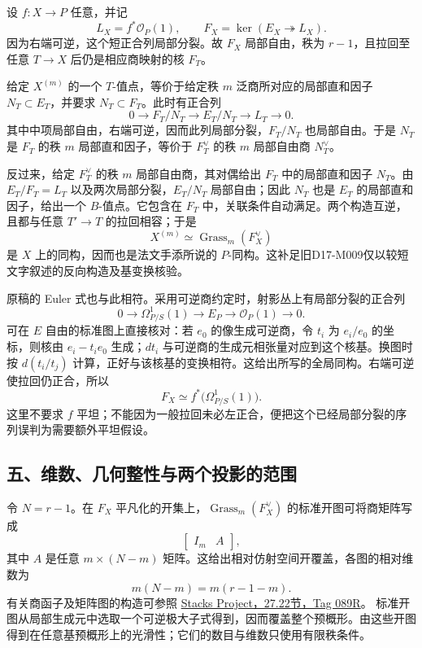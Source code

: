 \documentclass[UTF8,a4paper]{ctexbook}
\begin{document}
设 $f:X\to P$ 任意，并记
\[
L_X=f^*\mathcal O_P(1),\qquad
F_X=\ker(E_X\twoheadrightarrow L_X).
\]
因为右端可逆，这个短正合列局部分裂。故 $F_X$ 局部自由，秩为 $r-1$，且拉回至任意 $T\to X$ 后仍是相应商映射的核 $F_T$。

给定 $X^{(m)}$ 的一个 $T$-值点，等价于给定秩 $m$ 泛商所对应的局部直和因子 $N_T\subset E_T$，并要求 $N_T\subset F_T$。此时有正合列
\[
0\longrightarrow F_T/N_T\longrightarrow E_T/N_T
\longrightarrow L_T\longrightarrow0.
\]
其中中项局部自由，右端可逆，因而此列局部分裂，$F_T/N_T$ 也局部自由。于是 $N_T$ 是 $F_T$ 的秩 $m$ 局部直和因子，等价于 $F_T^\vee$ 的秩 $m$ 局部自由商 $N_T^\vee$。

反过来，给定 $F_T^\vee$ 的秩 $m$ 局部自由商，其对偶给出 $F_T$ 中的局部直和因子 $N_T$。由 $E_T/F_T=L_T$ 以及两次局部分裂，$E_T/N_T$ 局部自由；因此 $N_T$ 也是 $E_T$ 的局部直和因子，给出一个 $B$-值点。它包含在 $F_T$ 中，关联条件自动满足。两个构造互逆，且都与任意 $T'\to T$ 的拉回相容；于是
\[
X^{(m)}\simeq\operatorname{Grass}_m(F_X^\vee)
\]
是 $X$ 上的同构，因而也是法文手添所说的 $P$-同构。这补足旧D17-M009仅以较短文字叙述的反向构造及基变换核验。

原稿的 Euler 式也与此相符。采用可逆商约定时，射影丛上有局部分裂的正合列
\[
0\longrightarrow\Omega^1_{P/S}(1)\longrightarrow E_P
\longrightarrow\mathcal O_P(1)\longrightarrow0.
\]
可在 $E$ 自由的标准图上直接核对：若 $e_0$ 的像生成可逆商，令 $t_i$ 为 $e_i/e_0$ 的坐标，则核由 $e_i-t_i e_0$ 生成；$dt_i$ 与可逆商的生成元相张量对应到这个核基。换图时按 $d(t_i/t_j)$ 计算，正好与该核基的变换相符。这给出所写的全局同构。右端可逆使拉回仍正合，所以
\[
F_X\simeq f^*\bigl(\Omega^1_{P/S}(1)\bigr).
\]
这里不要求 $f$ 平坦；不能因为一般拉回未必左正合，便把这个已经局部分裂的序列误判为需要额外平坦假设。

\subsection*{五、维数、几何整性与两个投影的范围}

令 $N=r-1$。在 $F_X$ 平凡化的开集上，$\operatorname{Grass}_m(F_X^\vee)$ 的标准开图可将商矩阵写成
\[
\begin{bmatrix}I_m&A\end{bmatrix},
\]
其中 $A$ 是任意 $m\times(N-m)$ 矩阵。这给出相对仿射空间开覆盖，各图的相对维数为
\[
m(N-m)=m(r-1-m).
\]
有关商函子及矩阵图的构造可参照
\href{https://stacks.math.columbia.edu/tag/089R}{Stacks Project，27.22节，Tag 089R}。
标准开图从局部生成元中选取一个可逆极大子式得到，因而覆盖整个预概形。由这些开图得到在任意基预概形上的光滑性；它们的数目与维数只使用有限秩条件。
\end{document}
